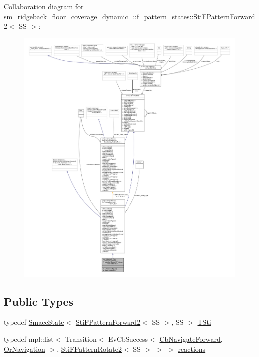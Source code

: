 Collaboration diagram for sm\+\_\+ridgeback\+\_\+floor\+\_\+coverage\+\_\+dynamic\+\_\+:\+:f\+\_\+pattern\+\_\+states\+:\+:Sti\+F\+Pattern\+Forward2$<$ SS $>$\+:
\nopagebreak
\begin{figure}[H]
\begin{center}
\leavevmode
\includegraphics[width=350pt]{structsm__ridgeback__floor__coverage__dynamic__1_1_1f__pattern__states_1_1StiFPatternForward2__coll__graph}
\end{center}
\end{figure}
\subsection*{Public Types}
\begin{DoxyCompactItemize}
\item 
typedef \hyperlink{classSmaccState}{Smacc\+State}$<$ \hyperlink{structsm__ridgeback__floor__coverage__dynamic__1_1_1f__pattern__states_1_1StiFPatternForward2}{Sti\+F\+Pattern\+Forward2}$<$ SS $>$, SS $>$ \hyperlink{structsm__ridgeback__floor__coverage__dynamic__1_1_1f__pattern__states_1_1StiFPatternForward2_a8aefeda207e5751e62b6a62e2901c8f9}{T\+Sti}
\item 
typedef mpl\+::list$<$ Transition$<$ Ev\+Cb\+Success$<$ \hyperlink{classcl__move__base__z_1_1CbNavigateForward}{Cb\+Navigate\+Forward}, \hyperlink{classsm__ridgeback__floor__coverage__dynamic__1_1_1OrNavigation}{Or\+Navigation} $>$, \hyperlink{structsm__ridgeback__floor__coverage__dynamic__1_1_1f__pattern__states_1_1StiFPatternRotate2}{Sti\+F\+Pattern\+Rotate2}$<$ SS $>$ $>$ $>$ \hyperlink{structsm__ridgeback__floor__coverage__dynamic__1_1_1f__pattern__states_1_1StiFPatternForward2_ad691b196400a95f809744191e95d0486}{reactions}
\end{DoxyCompactItemize}
